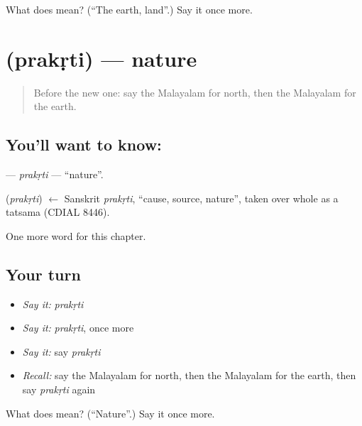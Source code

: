 \begin{tcolorbox}[breakable,colback=teal!4,colframe=teal!35!black,title={Before you move on}]
What does  mean? (\textquotedblleft{}The earth, land\textquotedblright{}.) Say it once more.
\end{tcolorbox}
\section[\texorpdfstring{\ml{പ്രകൃതി} (prakṛti)}{പ്രകൃതി (prakṛti)}]{ (prakṛti) — nature}

\label{lesson:ML-C316-prakrti}



\begin{quote}
Before the new one: say the Malayalam for north, then the Malayalam for the earth.
\end{quote}

\subsection*{You'll want to know: }
\textbf{} — \emph{prakṛti} — \textquotedblleft{}nature\textquotedblright{}.

\begin{cousinweb}
\textbf{} (\emph{prakṛti}) $\leftarrow$ Sanskrit \emph{prakṛti}, \textquotedblleft{}cause, source, nature\textquotedblright{}, taken over whole as a tatsama (CDIAL 8446).
\end{cousinweb}

\begin{grammarlens}[title={What you've built}]
One more word for this chapter.
\end{grammarlens}

\subsection*{Your turn}
\begin{itemize}
\raggedright
  \item \emph{Say it:} \emph{prakṛti}
  \item \emph{Say it:} \emph{prakṛti}, once more
  \item \emph{Say it:} say \emph{prakṛti}
  \item \emph{Recall:} say the Malayalam for north, then the Malayalam for the earth, then say \emph{prakṛti} again
\end{itemize}

\begin{tcolorbox}[breakable,colback=teal!4,colframe=teal!35!black,title={Before you move on}]
What does  mean? (\textquotedblleft{}Nature\textquotedblright{}.) Say it once more.
\end{tcolorbox}
